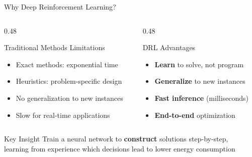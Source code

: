 \documentclass[aspectratio=169,11pt]{beamer}
\begin{document}
\begin{frame}{Why Deep Reinforcement Learning?}
    \begin{columns}[T]
        \begin{column}{0.48\textwidth}
            \begin{alertblock}{Traditional Methods Limitations}
                \begin{itemize}
                    \item Exact methods: exponential time
                    \item Heuristics: problem-specific design
                    \item No generalization to new instances
                    \item Slow for real-time applications
                \end{itemize}
            \end{alertblock}
        \end{column}
        \begin{column}{0.48\textwidth}
            \begin{exampleblock}{DRL Advantages}
                \begin{itemize}
                    \item \textbf{Learn} to solve, not program
                    \item \textbf{Generalize} to new instances
                    \item \textbf{Fast inference} (milliseconds)
                    \item \textbf{End-to-end} optimization
                \end{itemize}
            \end{exampleblock}
        \end{column}
    \end{columns}
    
    \vspace{0.5cm}
    \begin{block}{Key Insight}
        \centering
        Train a neural network to \textbf{construct} solutions step-by-step,\\
        learning from experience which decisions lead to lower energy consumption
    \end{block}
\end{frame}
\end{document}
